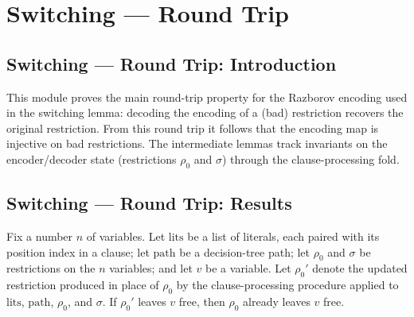 \section{Switching --- Round Trip}
\subsection*{Switching --- Round Trip: Introduction}

This module proves the main round-trip property for the Razborov encoding used in the
switching lemma: decoding the encoding of a (bad) restriction recovers the original
restriction. From this round trip it follows that the encoding map is injective on bad
restrictions. The intermediate lemmas track invariants on the encoder/decoder state
(restrictions $\rho_0$ and $\sigma$) through the clause-processing fold.

\subsection*{Switching --- Round Trip: Results}

\begin{lemma}
\label{SwitchingLemma.pcl_none_implies_rho_free}
\leanok
{}
Fix a number $n$ of variables. Let $\mathrm{lits}$ be a list of literals, each paired
with its position index in a clause; let $\mathrm{path}$ be a decision-tree path; let
$\rho_0$ and $\sigma$ be restrictions on the $n$ variables; and let $v$ be a variable.
Let $\rho_0'$ denote the updated restriction produced in place of $\rho_0$ by the
clause-processing procedure applied to $\mathrm{lits}$, $\mathrm{path}$, $\rho_0$, and
$\sigma$. If $\rho_0'$ leaves $v$ free, then $\rho_0$ already leaves $v$ free.
\end{lemma}

